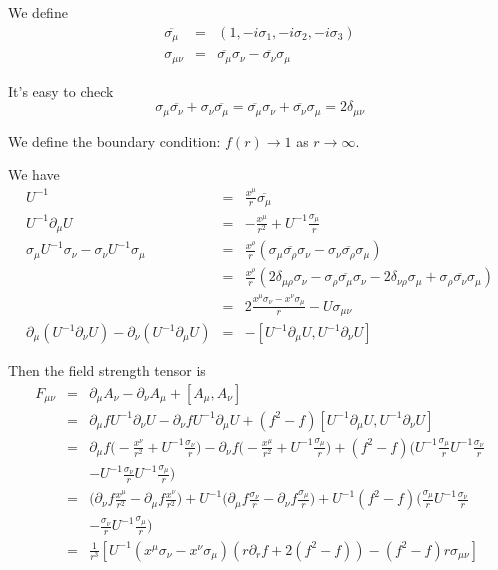 \documentclass[12pt]{book}
\begin{document}
		We define
		\begin{eqnarray}
			\overline{\sigma_\mu}&=&(1,-i\sigma_1,-i\sigma_2,-i\sigma_3)\\
			\sigma_{\mu\nu}&=&\overline{\sigma_\mu}\sigma_\nu-\overline{\sigma_\nu}\sigma_\mu
		\end{eqnarray}		
		
		It's easy to check 
		\begin{equation}
			\sigma_\mu\overline{\sigma_\nu}+\sigma_\nu\overline{\sigma_\mu}=\overline{\sigma_\mu}\sigma_\nu+\overline{\sigma_\nu}\sigma_\mu=2\delta_{\mu\nu}
		\end{equation}		
				
		We define the boundary condition: $f(r)\rightarrow1$ as $ r\rightarrow\infty$.
		
		We have
		\begin{eqnarray}
			U^{-1}&=&\frac{x^\mu}r\overline{\sigma_\mu}\\
			U^{-1}\partial_\mu U&=&-\frac {x^\mu}{r^2}+U^{-1}\frac {\sigma_\mu}r\\
			\sigma_\mu U^{-1}\sigma_\nu-\sigma_\nu U^{-1}\sigma_\mu&=&\frac{x^\rho}r(\sigma_\mu\overline{\sigma_\rho}\sigma_\nu-\sigma_\nu\overline{\sigma_\rho}\sigma_\mu)\\
			&=&\frac{x^\rho}r(2\delta_{\mu\rho}\sigma_\nu-\sigma_\rho\overline{\sigma_\mu}\sigma_\nu-2\delta_{\nu\rho}\sigma_\mu+\sigma_\rho\overline{\sigma_\nu}\sigma_\mu)\\
			&=&2\frac{x^\mu\sigma_\nu-x^\nu\sigma_\mu}r-U\sigma_{\mu\nu}\\
			\partial_\mu(U^{-1}\partial_\nu U)-\partial_\nu(U^{-1}\partial_\mu U)&=&-[U^{-1}\partial_\mu U,U^{-1}\partial_\nu U]
		\end{eqnarray}
		
		Then the field strength tensor is
		\begin{eqnarray}
			F_{\mu\nu}&=&\partial_\mu A_\nu-\partial_\nu A_\mu+[A_\mu,A_\nu]\\
			&=&\partial_\mu fU^{-1}\partial_\nu U-\partial_\nu f U^{-1}\partial_\mu U+(f^2-f)[U^{-1}\partial_\mu U,U^{-1}\partial_\nu U]\\
			&=&\partial_\mu f\Big(-\frac {x^\nu}{r^2}+U^{-1}\frac {\sigma_\nu}r\Big)-\partial_\nu f\Big(-\frac {x^\mu}{r^2}+U^{-1}\frac {\sigma_\mu}r\Big)+(f^2-f)\Big(U^{-1}\frac{\sigma_\mu}rU^{-1}\frac{\sigma_\nu}r\nonumber\\
			&&-U^{-1}\frac{\sigma_\nu}rU^{-1}\frac{\sigma_\mu}r\Big)\\
			&=&\Big(\partial_\nu f\frac {x^\mu}{r^2}-\partial_\mu f\frac {x^\nu}{r^2}\Big)+U^{-1}\Big(\partial_\mu f\frac {\sigma_\nu}r-\partial_\nu f\frac {\sigma_\mu}r\Big)+U^{-1}(f^2-f)\Big(\frac{\sigma_\mu}rU^{-1}\frac{\sigma_\nu}r\nonumber\\
			&&-\frac{\sigma_\nu}rU^{-1}\frac{\sigma_\mu}r\Big)\\
			&=&\frac 1{r^3}[U^{-1}(x^\mu \sigma_\nu-x^\nu \sigma_\mu)(r\partial_rf+2(f^2-f))-(f^2-f)r\sigma_{\mu\nu}]
		\end{eqnarray}
		
\end{document}
